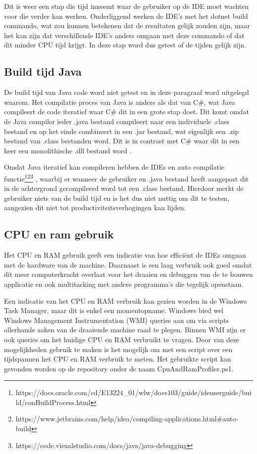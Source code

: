 Dit is weer een stap die tijd inneemt waar de gebruiker op de IDE moet wachten voor die verder kan werken. Onderliggend werken de IDE’s met het dotnet build commando, wat zou kunnen betekenen dat de resultaten gelijk zouden zijn, maar het kan zijn dat verschillende IDE’s anders omgaan met deze commando of dat dit minder CPU tijd krijgt. In deze stap word dus getest of de tijden gelijk zijn.

\subsection{Build tijd Java}
De build tijd van Java code word niet getest en in deze paragraaf word uitgelegd waarom. Het compilatie proces van Java is anders als dat van C\#, wat Java compileert de code iteratief waar C\# dit in een grote stap doet. Dit komt omdat de Java compiler ieder .java bestand compileert naar een individuele .class bestand en op het einde combineert in een .jar bestand, wat eigenlijk een .zip bestand van .class bestanden word. Dit is in contrast met C\# waar dit in een keer een monolithische .dll bestand word \autocite{Parveen2016}.

Omdat Java iteratief kan compileren hebben de IDEs en auto compilatie functie\footnote{https://docs.oracle.com/cd/E13224\_01/wlw/docs103/guide/ideuserguide/build/conBuildProcess.html}\footnote{https://www.jetbrains.com/help/idea/compiling-applications.html\#auto-build}\footnote{https://code.visualstudio.com/docs/java/java-debugging} , waarbij er wanneer de gebruiker en .java bestand heeft aangepast dit in de achtergrond gecompileerd word tot een .class bestand. Hierdoor merkt de gebruiker niets van de build tijd en is het dus niet nuttig om dit te testen, aangezien dit niet tot productiviteitsverhogingen kan lijden.

\subsection{CPU en ram gebruik}
Het CPU en RAM gebruik geeft een indicatie van hoe efficiënt de IDEs omgaan met de hardware van de machine. Daarnaast is een laag verbruik ook goed omdat dit meer computerkracht overlaat voor het draaien en debuggen van de te bouwen applicatie en ook multitasking met andere programma’s die tegelijk openstaan.

Een indicatie van het CPU en RAM verbruik kan gezien worden in de Windows Task Manager, maar dit is enkel een momentopname. Windows bied wel Windows Management Instrumentation (WMI) queries aan om via scripts allerhande zaken van de draaiende machine raad te plegen. Binnen WMI zijn er ook queries om het huidige CPU en RAM verbruikt te vragen. Door van deze mogelijkheden gebruik te maken is het mogelijk om met een script over een tijdspannen het CPU en RAM verbruik te meten. Het gebruikte script kan gevonden worden op de repository onder de naam CpuAndRamProfiler.ps1.

